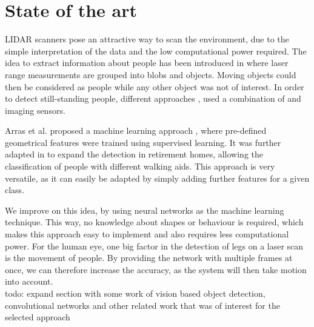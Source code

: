 \section{State of the art}

LIDAR scanners pose an attractive way to scan the environment, due to the simple interpretation of the data and the low computational power required. 
The idea to extract information about people has been introduced in \cite{1013691} where laser range measurements  are grouped into blobs and objects. 
Moving objects could then be considered as people while any other object was not of interest. 
In order to detect still-standing people, different approaches \cite{kleinehagenbrock2002person}, \cite{aguirre2014leg} used a combination of  and imaging sensors.

Arras et al. proposed a machine learning approach \cite{Arras07usingboosted}, where pre-defined geometrical features were trained using supervised learning. 
It was further adapted in \cite{weinrich2014people} to expand the detection in retirement homes, allowing the classification of people with different walking aids. 
This approach is very versatile, as it can easily be adapted by simply adding further features for a given class.

We improve on this idea, by using neural networks as the machine learning technique.
This way, no knowledge about shapes or behaviour is required, which makes this approach easy to implement and also requires less computational power. 
For the human eye, one big factor in the detection of legs on a laser scan is the movement of people. 
By providing the network with multiple frames at once, we can therefore increase the accuracy, as the system will then take motion into account.\\

todo: expand section with some work of vision based object detection, convolutional networks and other related work that was of interest for the selected approach